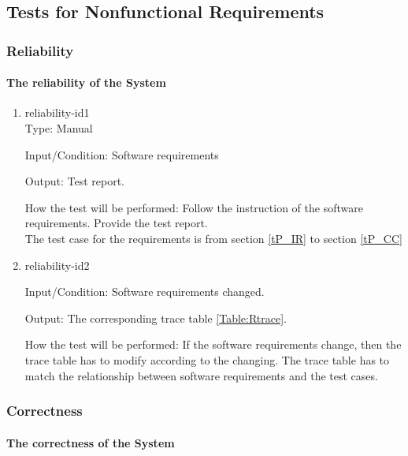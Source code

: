 \documentclass[12pt, titlepage]{article}
\begin{document}
\subsection{Tests for Nonfunctional Requirements}

 

\subsubsection{Reliability}
\paragraph{The reliability of the System}

\begin{enumerate} 
\item{reliability-id1\\} 
Type: Manual

Input/Condition: Software requirements

Output: Test report.

How the test will be performed: Follow the instruction of the software requirements. Provide the test report.\\
The test case for the \progname requirements is from section \ref{tP_IR} to section \ref{tP_CC}

\item{reliability-id2\\} 

Input/Condition: Software requirements changed.

Output: The corresponding trace table \ref{Table:Rtrace}.

How the test will be performed: If the software requirements change, then the trace table has to modify according to the changing. The trace table has to match the relationship between software requirements and the test cases.

\end{enumerate} 

\subsubsection{Correctness}
\paragraph{The correctness of the System}
\end{document}
